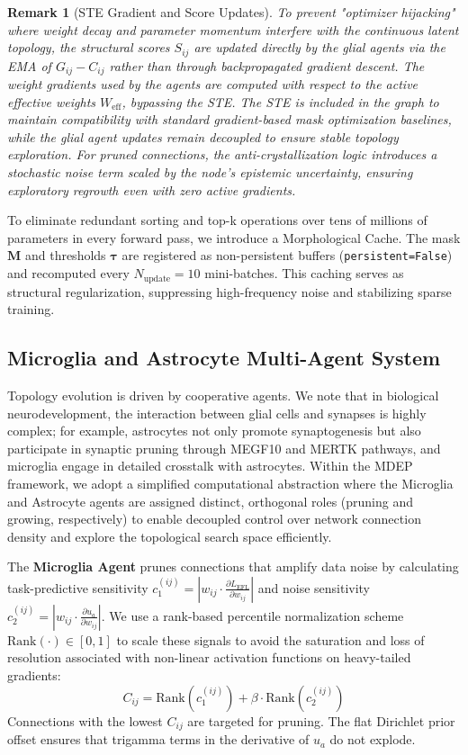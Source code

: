 \documentclass[letterpaper]{article} %
\newtheorem{remark}{Remark}
\begin{document}
\begin{remark}[STE Gradient and Score Updates]
To prevent "optimizer hijacking" where weight decay and parameter momentum interfere with the continuous latent topology, the structural scores $S_{ij}$ are updated directly by the glial agents via the EMA of $G_{ij} - C_{ij}$ rather than through backpropagated gradient descent. The weight gradients used by the agents are computed with respect to the active effective weights $W_{\text{eff}}$, bypassing the STE. The STE is included in the graph to maintain compatibility with standard gradient-based mask optimization baselines, while the glial agent updates remain decoupled to ensure stable topology exploration. For pruned connections, the anti-crystallization logic introduces a stochastic noise term scaled by the node's epistemic uncertainty, ensuring exploratory regrowth even with zero active gradients.
\end{remark}

To eliminate redundant sorting and top-k operations over tens of millions of parameters in every forward pass, we introduce a Morphological Cache. The mask $\bm{M}$ and thresholds $\bm{\tau}$ are registered as non-persistent buffers (\texttt{persistent=False}) and recomputed every $N_{\text{update}} = 10$ mini-batches. This caching serves as structural regularization, suppressing high-frequency noise and stabilizing sparse training.

\subsection{Microglia and Astrocyte Multi-Agent System}
Topology evolution is driven by cooperative agents. We note that in biological neurodevelopment, the interaction between glial cells and synapses is highly complex; for example, astrocytes not only promote synaptogenesis but also participate in synaptic pruning through MEGF10 and MERTK pathways, and microglia engage in detailed crosstalk with astrocytes. Within the MDEP framework, we adopt a simplified computational abstraction where the Microglia and Astrocyte agents are assigned distinct, orthogonal roles (pruning and growing, respectively) to enable decoupled control over network connection density and explore the topological search space efficiently.

The \textbf{Microglia Agent} prunes connections that amplify data noise by calculating task-predictive sensitivity $c_1^{(ij)} = | w_{ij} \cdot \frac{\partial L_{\text{EFL}}}{\partial w_{ij}} |$ and noise sensitivity $c_2^{(ij)} = | w_{ij} \cdot \frac{\partial u_a}{\partial w_{ij}} |$. We use a rank-based percentile normalization scheme $\text{Rank}(\cdot) \in [0, 1]$ to scale these signals to avoid the saturation and loss of resolution associated with non-linear activation functions on heavy-tailed gradients:
\begin{equation}\label{eq:C_ij}
    C_{ij} = \text{Rank}(c_1^{(ij)}) + \beta \cdot \text{Rank}(c_2^{(ij)})
\end{equation}
Connections with the lowest $C_{ij}$ are targeted for pruning. The flat Dirichlet prior offset ensures that trigamma terms in the derivative of $u_a$ do not explode.
\end{document}

